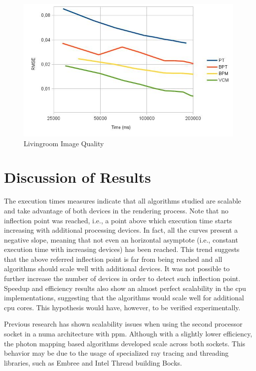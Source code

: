 \begin{figure}[H]
\centering
\includegraphics[width=0.8\linewidth]{img/livingroomImgq.jpg}
\caption{\label{img:livingroomImgq} Livingroom Image Quality}
\end{figure}

\section{Discussion of Results}

The execution times measures indicate that all algorithms studied are scalable and take advantage of both devices in the rendering process. Note that no inflection point was reached, i.e., a point above which execution time starts increasing with additional processing devices. In fact, all the curves present a negative slope, meaning that not even an horizontal asymptote (i.e., constant execution time with increasing devices) has been reached. This trend suggests that the above referred inflection point is far from being reached and all algorithms should scale well with additional devices. It was not possible to further increase the number of devices in order to detect such inflection point. Speedup and efficiency results also show an almost perfect scalability in the \gls{cpu} implementations, suggesting that the algorithms would scale well for additional \gls{cpu} cores. This hypothesis would have, however, to be verified experimentally.

Previous research \citep{Palhas2013} has shown scalability issues when using the second processor socket in a \gls{numa} architecture with \gls{ppm}. Although with a slightly lower efficiency, the photon mapping based algorithms developed scale across both sockets. This behavior may be due to the usage of specialized ray tracing and threading libraries, such as Embree and Intel Thread building Bocks.

